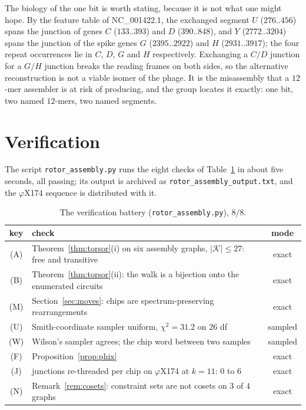 \documentclass[11pt]{article}
\theoremstyle{plain}
\theoremstyle{definition}
\theoremstyle{remark}
\newcommand{\K}{\mathcal{K}}
\begin{document}
The biology of the one bit is worth stating, because it is not what one might hope. By
the feature table of NC\_001422.1, the exchanged segment $U$ ($276..456$) spans the
junction of genes $C$ ($133..393$) and $D$ ($390..848$), and $Y$ ($2772..3204$) spans the
junction of the spike genes $G$ ($2395..2922$) and $H$ ($2931..3917$); the four repeat
occurrences lie in $C$, $D$, $G$ and $H$ respectively. Exchanging a $C/D$ junction for a
$G/H$ junction breaks the reading frames on both sides, so the alternative reconstruction
is not a viable isomer of the phage. It is the misassembly that a $12$-mer assembler is at
risk of producing, and the group locates it exactly: one bit, two named $12$-mers, two
named segments.

\section{Verification}\label{sec:battery}

The script \texttt{rotor\_assembly.py} runs the eight checks of Table~\ref{tab:battery} in
about five seconds, all passing; its output is archived as
\texttt{rotor\_assembly\_output.txt}, and the $\varphi$X174 sequence is distributed with it.

\begin{table}[ht]
\centering\small
\begin{tabular}{clc}
\toprule
key & check & mode\\
\midrule
(A) & Theorem~\ref{thm:torsor}(i) on six assembly graphs, $|\K|\le27$: free and transitive & exact\\
(B) & Theorem~\ref{thm:torsor}(ii): the walk is a bijection onto the enumerated circuits & exact\\
(M) & Section~\ref{sec:moves}: chips are spectrum-preserving rearrangements & exact\\
(U) & Smith-coordinate sampler uniform, $\chi^{2}=31.2$ on $26$ df & sampled\\
(W) & Wilson's sampler agrees; the chip word between two samples & sampled\\
(F) & Proposition~\ref{prop:phix} & exact\\
(J) & junctions re-threaded per chip on $\varphi$X174 at $k=11$: $0$ to $6$ & exact\\
(N) & Remark~\ref{rem:cosets}: constraint sets are not cosets on $3$ of $4$ graphs & exact\\
\bottomrule
\end{tabular}
\caption{The verification battery (\texttt{rotor\_assembly.py}), $8/8$.}
\label{tab:battery}
\end{table}
\end{document}
